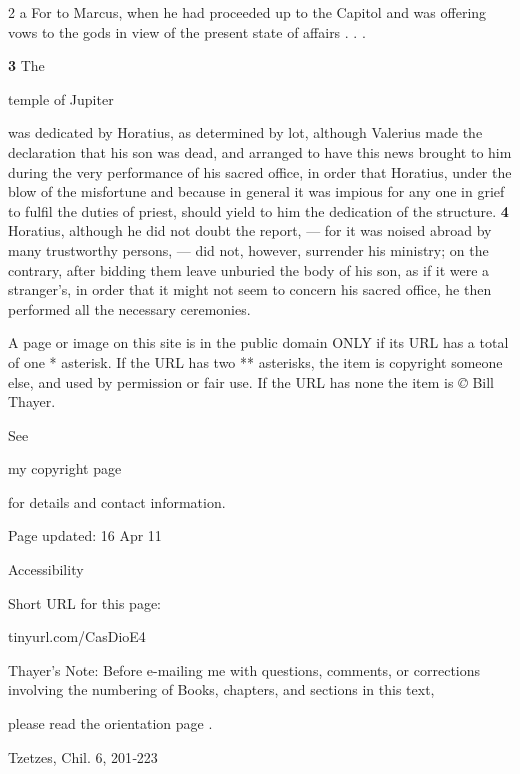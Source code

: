 2 a For to Marcus, when he had proceeded up to the Capitol and was offering vows to the gods in view of the present state of affairs . . .

\textbf{3}
The

temple of Jupiter

was dedicated by Horatius, as determined by lot, although Valerius made the declaration that his son was dead, and arranged to have this news brought to him during the very performance of his sacred office, in order that Horatius, under the blow of the misfortune and because in general it was impious for any one in grief to fulfil the duties of priest, should yield to him the dedication of the structure. \textbf{4} Horatius, although he did not doubt the report, \texthebrew{—} for it was noised abroad by many trustworthy persons, \texthebrew{—} did not, however, surrender his ministry; on the contrary, after bidding them leave unburied the body of his son, as if it were a stranger's, in order that it might not seem to concern his sacred office, he then performed all the necessary ceremonies.

A page or image on this site is in the public domain ONLY if its URL has a total of one * asterisk. If the URL has two ** asterisks, the item is copyright someone else, and used by permission or fair use. If the URL has none the item is \emph{©} Bill Thayer.

See

my copyright page

for details and contact information.

Page updated:
16 Apr 11

Accessibility


Short URL for this page:

tinyurl.com/CasDioE4

Thayer's Note: Before e-mailing me with questions, comments, or corrections involving the numbering of Books, chapters, and sections in this text,

please read the orientation page .

Tzetzes, Chil. 6, 201\texthebrew{‑}223


